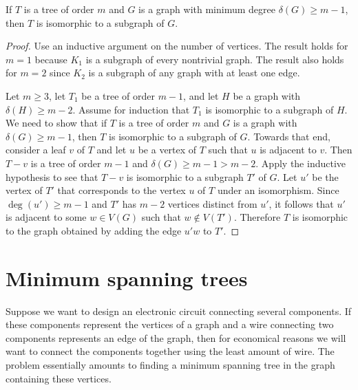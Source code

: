 \begin{theorem}
If $T$ is a tree of order $m$ and $G$ is a graph with minimum degree
$\delta(G) \geq m - 1$, then $T$ is isomorphic to a subgraph of $G$.
\end{theorem}

\begin{proof}
Use an inductive argument on the number of vertices. The result holds
for $m = 1$ because $K_1$ is a subgraph of every nontrivial graph. The
result also holds for $m = 2$ since $K_2$ is a subgraph of any graph
with at least one edge.

Let $m \geq 3$, let $T_1$ be a tree of order $m - 1$, and let $H$ be a
graph with $\delta(H) \geq m - 2$. Assume for induction that $T_1$ is
isomorphic to a subgraph of $H$. We need to show that if $T$ is a tree
of order $m$ and $G$ is a graph with $\delta(G) \geq m - 1$, then $T$
is isomorphic to a subgraph of $G$. Towards that end, consider a leaf
$v$ of $T$ and let $u$ be a vertex of $T$ such that $u$ is adjacent to
$v$. Then $T - v$ is a tree of order $m - 1$ and
$\delta(G) \geq m - 1 > m - 2$. Apply the inductive hypothesis to see
that $T - v$ is isomorphic to a subgraph $T'$ of $G$. Let $u'$ be the
vertex of $T'$ that corresponds to the vertex $u$ of $T$ under an
isomorphism. Since $\deg(u') \geq m - 1$ and $T'$ has $m - 2$ vertices
distinct from $u'$, it follows that $u'$ is adjacent to some
$w \in V(G)$ such that $w \notin V(T')$. Therefore $T$ is isomorphic
to the graph obtained by adding the edge $u'w$ to $T'$.
\end{proof}



\section{Minimum spanning trees}

Suppose we want to design an electronic circuit connecting several
components. If these components represent the vertices of a graph and
a wire connecting two components represents an edge of the graph, then
for economical reasons we will want to connect the components together
using the least amount of wire. The problem essentially amounts to
finding a minimum spanning tree in the graph containing these vertices.

